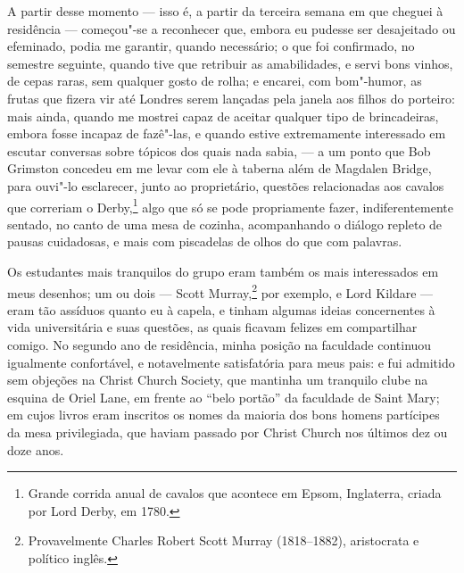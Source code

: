 A partir desse momento --- isso é, a partir da terceira semana em
que cheguei à residência --- começou"-se a reconhecer que, embora eu
pudesse ser desajeitado ou efeminado, podia me garantir, quando
necessário; o que foi confirmado, no semestre seguinte, quando tive que
retribuir as amabilidades, e servi bons vinhos, de cepas raras, sem
qualquer gosto de rolha; e encarei, com bom"-humor, as frutas que fizera
vir até Londres serem lançadas pela janela aos filhos do porteiro: mais
ainda, quando me mostrei capaz de aceitar qualquer tipo de brincadeiras,
embora fosse incapaz de fazê"-las, e quando estive extremamente
interessado em escutar conversas sobre tópicos dos quais nada sabia, ---
a um ponto que Bob Grimston concedeu em me levar com ele à taberna além
de Magdalen Bridge, para ouvi"-lo esclarecer, junto ao proprietário,
questões relacionadas aos cavalos que correriam o Derby,\footnote{Grande
  corrida anual de cavalos que acontece em Epsom, Inglaterra, criada por
  Lord Derby, em 1780.} algo que só se pode propriamente
fazer, indiferentemente sentado, no canto de uma mesa de cozinha,
acompanhando o diálogo repleto de pausas cuidadosas, e mais com
piscadelas de olhos do que com palavras.

Os estudantes mais tranquilos do grupo eram também os mais interessados
em meus desenhos; um ou dois --- Scott Murray,\footnote{Provavelmente
  Charles Robert Scott Murray (1818--1882), aristocrata e político inglês.} por exemplo, e Lord Kildare --- eram tão assíduos
quanto eu à capela, e tinham algumas ideias concernentes à vida
universitária e suas questões, as quais ficavam felizes em compartilhar
comigo. No segundo ano de residência, minha posição na faculdade
continuou igualmente confortável, e notavelmente satisfatória para meus
pais: e fui admitido sem objeções na Christ Church Society, que mantinha
um tranquilo clube na esquina de Oriel Lane, em frente ao ``belo
portão'' da faculdade de Saint Mary; em cujos livros eram inscritos os
nomes da maioria dos bons homens partícipes da mesa privilegiada, que
haviam passado por Christ Church nos últimos dez ou doze anos.

